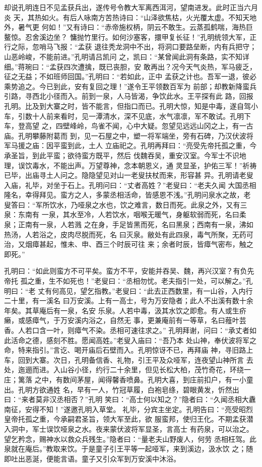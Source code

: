 却说孔明连日不见孟获兵出，遂传号令教大军离西洱河，望南进发。此时正当六月炎
天，其热如火。有后人咏南方苦热诗曰：“山泽欲焦枯，火光覆太虚。不知天地外，暑气更
何如！”又有诗曰：“赤帝施权柄，阴云不敢生。云蒸孤鹤喘，海热巨鳌惊。忍舍溪边坐？
慵抛竹里行。如何沙塞客，擐甲复长征！”孔明统领大军，正行之际，忽哨马飞报：“孟获
退往秃龙洞中不出，将洞口要路垒断，内有兵把守；山恶岭峻，不能前进。”孔明请吕凯问
之，凯曰：“某曾闻此洞有条路，实不知详细。”蒋琬曰：“孟获四次遭擒，既已丧胆，安
敢再出？况今天气炎热，军马疲乏，征之无益；不如班师回国。”孔明曰：“若如此，正中
孟获之计也。吾军一退，彼必乘势追之。今已到此，安有复回之理！”遂令王平领数百军为
前部；却教新降蛮兵引路，寻西北小径而入。前到一泉，人马皆渴，争饮此水。王平探有此
路，回报孔明。比及到大寨之时，皆不能言，但指口而已。孔明大惊，知是中毒，遂自驾小
车，引数十人前来看时，见一潭清水，深不见底，水气凛凛，军不敢试。孔明下车，登高望
之，四壁峰岭，鸟雀不闻，心中大疑。忽望见远远山冈之上，有一古庙。孔明攀藤附葛而
到，见一石屋之中，塑一将军端坐，旁有石碑，乃汉伏波将军马援之庙：因平蛮到此，土人
立庙祀之。孔明再拜曰：“亮受先帝托孤之重，今承圣旨，到此平蛮；欲待蛮方既平，然后
伐魏吞吴，重安汉室。今军士不识地理，误饮毒水，不能出声。万望尊神，念本朝恩义，通
灵显圣，护佑三军！”祈祷已毕，出庙寻土人问之。隐隐望见对山一老叟扶杖而来，形容甚
异。孔明请老叟入庙，礼毕，对坐于石上。孔明问曰：“丈者高姓？”老叟曰：“老夫久闻
大国丞相隆名，幸得拜见。蛮方之人，多蒙丞相活命，皆感恩不浅。”孔明问泉水之故，老
叟答曰：“军所饮水，乃哑泉之水也，饮之难言，数日而死。此泉之外，又有三泉：东南有
一泉，其水至冷，人若饮水，咽喉无暖气，身躯软弱而死，名曰柔泉；正南有一泉，人若溅
之在身，手足皆黑而死，名曰黑泉；西南有一泉，沸如热汤，人若浴之，皮肉尽脱而死，名
曰灭泉。敝处有此四泉，毒气所聚，无药可治，又烟瘴甚起，惟未、申、酉三个时辰可往
来；余者时辰，皆瘴气密布，触之即死。”

孔明曰：“如此则蛮方不可平矣。蛮方不平，安能并吞吴、魏，再兴汉室？有负先帝托
孤之重，生不如死也！”老叟曰：“丞相勿忧。老夫指引一处，可以解之。”孔明曰：“老
丈有何高见，望乞指教。”老叟曰：“此去正西数里，有一山谷，入内行二十里，有一溪名
曰万安溪。上有一高士，号为万安隐者；此人不出溪有数十余年矣。其草庵后有一泉，名安
乐泉。人若中毒，汲其水饮之即愈。有人或生疥癞，或感瘴气，于万安溪内浴之，自然无
事，更兼庵前有一等草，名曰薤叶芸香。人若口含一叶，则瘴气不染。丞相可速往求之。”
孔明拜谢，问曰：“承丈者如此活命之德，感刻不胜。愿闻高姓。”老叟入庙曰：“吾乃本
处山神，奉伏波将军之命，特来指引。”言讫、喝开庙后石壁而入。孔明惊讶不已，再拜庙
神，寻旧路上车，回到大寨。次日，孔明备信香、礼物，引王平及众哑军，连夜望山神所言
去处，迤逦而进。入山谷小径，约行二十余里，但见长松大柏，茂竹奇花，环绕一庄；篱落
之中，有数间茅屋，闻得馨香喷鼻。孔明大喜，到庄前扣户，有一小童出。孔明方欲通姓
名，早有一人，竹冠草履，白袍皂绦，碧眼黄发，忻然出曰：“来者莫非汉丞相否？”孔明
笑曰：“高士何以知之？”隐者曰：“久闻丞相大纛南征，安得不知！”遂邀孔明入草堂。
礼毕，分宾主坐定。孔明告曰：“亮受昭烈皇帝托孤之重，今承嗣君圣旨，领大军至此，欲
服蛮邦，使归王化。不期孟获潜入洞中，军士误饮哑泉之水。夜来蒙伏波将军显圣，言高士
有药泉，可以治之。望乞矜念，赐神水以救众兵残生。”隐者曰：“量老夫山野废人，何劳
丞相枉驾。此泉就在庵后。”教取来饮。于是童子引王平等一起哑军，来到溪边，汲水饮
之；随即吐出恶涎，便能言语。童子又引众军到万安溪中沐浴。

